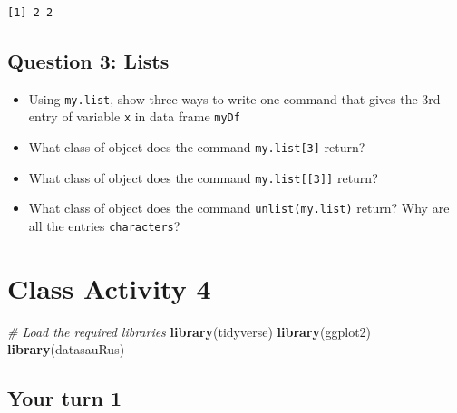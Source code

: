 \documentclass[
]{book}
\newenvironment{Shaded}{\begin{snugshade}}{\end{snugshade}}
\newcommand{\CommentTok}[1]{\textcolor[rgb]{0.56,0.35,0.01}{\textit{#1}}}
\newcommand{\FunctionTok}[1]{\textcolor[rgb]{0.13,0.29,0.53}{\textbf{#1}}}
\newcommand{\NormalTok}[1]{#1}
\providecommand{\tightlist}{%
  \setlength{\itemsep}{0pt}\setlength{\parskip}{0pt}}
\begin{document}
\begin{verbatim}
[1] 2 2
\end{verbatim}

\hypertarget{question-3-lists}{%
\section{Question 3: Lists}\label{question-3-lists}}

\begin{itemize}
\tightlist
\item
  Using \texttt{my.list}, show three ways to write one command that gives the 3rd entry of variable \texttt{x} in data frame \texttt{myDf}
\end{itemize}

\begin{itemize}
\tightlist
\item
  What class of object does the command \texttt{my.list{[}3{]}} return?
\end{itemize}

\begin{itemize}
\tightlist
\item
  What class of object does the command \texttt{my.list{[}{[}3{]}{]}} return?
\end{itemize}

\begin{itemize}
\tightlist
\item
  What class of object does the command \texttt{unlist(my.list)} return? Why are all the entries \texttt{characters}?
\end{itemize}

\hypertarget{class-activity-4}{%
\chapter{Class Activity 4}\label{class-activity-4}}

\begin{Shaded}
\begin{Highlighting}[]
\CommentTok{\# Load the required libraries}
\FunctionTok{library}\NormalTok{(tidyverse)}
\FunctionTok{library}\NormalTok{(ggplot2)}
\FunctionTok{library}\NormalTok{(datasauRus)}
\end{Highlighting}
\end{Shaded}

\hypertarget{your-turn-1}{%
\section{Your turn 1}\label{your-turn-1}}
\end{document}
